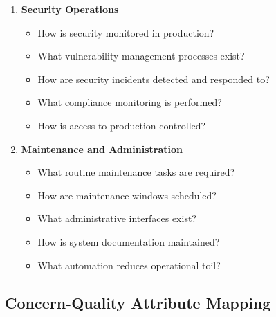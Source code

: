 \documentclass[11pt,letterpaper]{article}
\begin{document}
\begin{enumerate}[label=\textbf{C\arabic*:}, leftmargin=2.5em]
    \item \textbf{Security Operations}
    \begin{itemize}[nosep]
        \item How is security monitored in production?
        \item What vulnerability management processes exist?
        \item How are security incidents detected and responded to?
        \item What compliance monitoring is performed?
        \item How is access to production controlled?
    \end{itemize}
    
    \item \textbf{Maintenance and Administration}
    \begin{itemize}[nosep]
        \item What routine maintenance tasks are required?
        \item How are maintenance windows scheduled?
        \item What administrative interfaces exist?
        \item How is system documentation maintained?
        \item What automation reduces operational toil?
    \end{itemize}
\end{enumerate}

\subsection{Concern-Quality Attribute Mapping}
\end{document}

